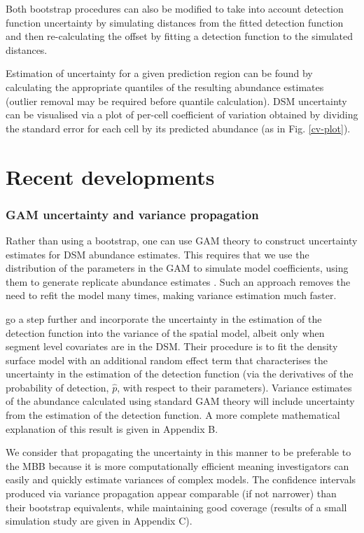 \documentclass[a4paper,12pt]{article}
\begin{document}
Both bootstrap procedures can also be modified to take into account detection function uncertainty by simulating distances from the fitted detection function and then re-calculating the offset by fitting a detection function to the simulated distances.
 
Estimation of uncertainty for a given prediction region can be found by calculating the appropriate quantiles of the resulting abundance estimates (outlier removal may be required before quantile calculation). DSM uncertainty can be visualised via a plot of per-cell coefficient of variation obtained by dividing the standard error for each cell by its predicted abundance (as in Fig. \ref{cv-plot}). 

\section*{Recent developments}
\label{s:recentadvances}

\subsubsection*{GAM uncertainty and variance propagation}

Rather than using a bootstrap, one can use GAM theory to construct uncertainty estimates for DSM abundance estimates. This requires that we use the distribution of the parameters in the GAM to simulate model coefficients, using them to generate replicate abundance estimates \citep[further information can found in][page 245]{Wood:2006wz}. Such an approach removes the need to refit the model many times, making variance estimation much faster.
 
\cite{WILLIAMS:2011in} go a step further and incorporate the uncertainty in the estimation of the detection function into the variance of the spatial model, albeit only when segment level covariates are in the DSM. Their procedure is to fit the density surface model with an additional random effect term that characterises the uncertainty in the estimation of the detection function (via the derivatives of the probability of detection, $\hat{p}$, with respect to their parameters). Variance estimates of the abundance calculated using standard GAM theory will include uncertainty from the estimation of the detection function. A more complete mathematical explanation of this result is given in Appendix B.

We consider that propagating the uncertainty in this manner to be preferable to the MBB because it is more computationally efficient meaning investigators can easily and quickly estimate variances of complex models. The confidence intervals produced via variance propagation appear comparable (if not narrower) than their bootstrap equivalents, while maintaining good coverage (results of a small simulation study are given in Appendix C).
\end{document}
